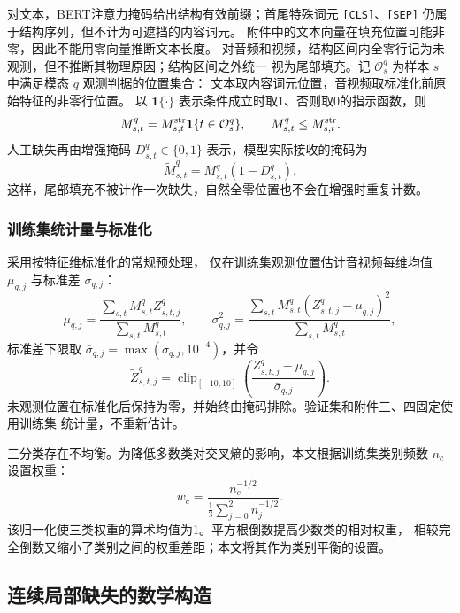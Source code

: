 \documentclass[bwprint]{gmcmthesis}
\begin{document}
对文本，BERT注意力掩码给出结构有效前缀；首尾特殊词元
\texttt{[CLS]}、\texttt{[SEP]} 仍属于结构序列，但不计为可遮挡的内容词元。
附件中的文本向量在填充位置可能非零，因此不能用零向量推断文本长度。
对音频和视频，结构区间内全零行记为未观测，但不推断其物理原因；结构区间之外统一
视为尾部填充。记 $\mathcal O_s^q$ 为样本 $s$ 中满足模态 $q$ 观测判据的位置集合：
文本取内容词元位置，音视频取标准化前原始特征的非零行位置。
以 $\mathbf 1\{\cdot\}$ 表示条件成立时取1、否则取0的指示函数，则
\begin{equation}
 M^q_{s,t}=M^{\rm str}_{s,t}\mathbf 1\{t\in\mathcal O_s^q\},
 \qquad M^q_{s,t}\le M^{\rm str}_{s,t}.
 \label{eq:p2-mask-contract}
\end{equation}
人工缺失再由增强掩码 $D^q_{s,t}\in\{0,1\}$ 表示，模型实际接收的掩码为
\begin{equation}
 \widetilde M^q_{s,t}=M^q_{s,t}(1-D^q_{s,t}).
 \label{eq:p2-effective-mask}
\end{equation}
这样，尾部填充不被计作一次缺失，自然全零位置也不会在增强时重复计数。

\subsubsection{训练集统计量与标准化}

采用按特征维标准化的常规预处理\citep{goodfellow2016deep}，
仅在训练集观测位置估计音视频每维均值 $\mu_{q,j}$ 与标准差 $\sigma_{q,j}$：
\begin{equation}
 \mu_{q,j}=\frac{\sum_{s,t}M^q_{s,t}Z^q_{s,t,j}}{\sum_{s,t}M^q_{s,t}},\qquad
 \sigma_{q,j}^2=\frac{\sum_{s,t}M^q_{s,t}(Z^q_{s,t,j}-\mu_{q,j})^2}
 {\sum_{s,t}M^q_{s,t}},
 \label{eq:p2-standardization}
\end{equation}
标准差下限取 $\bar\sigma_{q,j}=\max(\sigma_{q,j},10^{-4})$，并令
\[
 \widetilde Z^q_{s,t,j}=\operatorname{clip}_{[-10,10]}
 \left(\frac{Z^q_{s,t,j}-\mu_{q,j}}{\bar\sigma_{q,j}}\right).
\]
未观测位置在标准化后保持为零，并始终由掩码排除。验证集和附件三、四固定使用训练集
统计量，不重新估计。

三分类存在不均衡。为降低多数类对交叉熵的影响，本文根据训练集类别频数 $n_c$ 设置权重：
\begin{equation}
 w_c=\frac{n_c^{-1/2}}{\frac13\sum_{j=0}^{2}n_j^{-1/2}}.
 \label{eq:p2-class-weight}
\end{equation}
该归一化使三类权重的算术均值为1。平方根倒数提高少数类的相对权重，
相较完全倒数又缩小了类别之间的权重差距；本文将其作为类别平衡的设置。

\subsection{连续局部缺失的数学构造}
\end{document}
